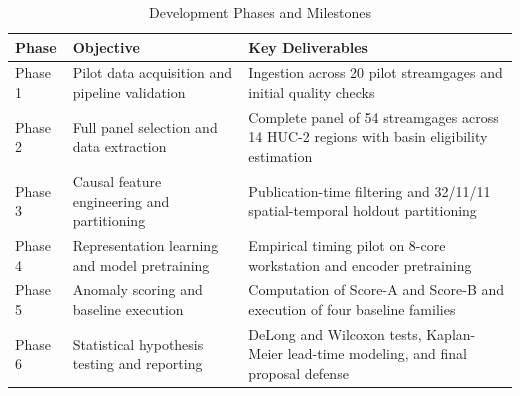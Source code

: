\documentclass[12pt]{report}
\begin{document}
\begin{table}[h]
  \caption{Development Phases and Milestones}
  \label{tab:timeline}
  \centering
  \begin{tabular}{|p{2.2cm}|p{4.8cm}|p{4.8cm}|}
    \hline
    \textbf{Phase} & \textbf{Objective} & \textbf{Key Deliverables} \\
    \hline
    Phase 1 & Pilot data acquisition and pipeline validation & Ingestion across 20 pilot streamgages and initial quality checks \\
    \hline
    Phase 2 & Full panel selection and data extraction & Complete panel of 54 streamgages across 14 HUC-2 regions with basin eligibility estimation \\
    \hline
    Phase 3 & Causal feature engineering and partitioning & Publication-time filtering and 32/11/11 spatial-temporal holdout partitioning \\
    \hline
    Phase 4 & Representation learning and model pretraining & Empirical timing pilot on 8-core workstation and encoder pretraining \\
    \hline
    Phase 5 & Anomaly scoring and baseline execution & Computation of Score-A and Score-B and execution of four baseline families \\
    \hline
    Phase 6 & Statistical hypothesis testing and reporting & DeLong and Wilcoxon tests, Kaplan-Meier lead-time modeling, and final proposal defense \\
    \hline
  \end{tabular}
\end{table}
\end{document}
